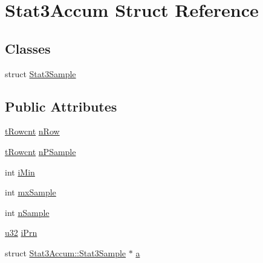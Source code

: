 \hypertarget{struct_stat3_accum}{\section{Stat3\-Accum Struct Reference}
\label{struct_stat3_accum}
}
\subsection*{Classes}
\begin{DoxyCompactItemize}
\item 
struct \hyperlink{struct_stat3_accum_1_1_stat3_sample}{Stat3\-Sample}
\end{DoxyCompactItemize}
\subsection*{Public Attributes}
\begin{DoxyCompactItemize}
\item 
\hyperlink{sqlite3_8c_a6de101211e945e499510b624a65c28a4}{t\-Rowcnt} \hyperlink{struct_stat3_accum_a9232d8f0271bc7feff09927e1683fdfc}{n\-Row}
\item 
\hyperlink{sqlite3_8c_a6de101211e945e499510b624a65c28a4}{t\-Rowcnt} \hyperlink{struct_stat3_accum_aaad385a6c7100fc8674f98bee196d78d}{n\-P\-Sample}
\item 
int \hyperlink{struct_stat3_accum_a33a25df2bf3dae63cc1960d4e5586e1d}{i\-Min}
\item 
int \hyperlink{struct_stat3_accum_a736d6f6da776d17f54a87e31a457f4bb}{mx\-Sample}
\item 
int \hyperlink{struct_stat3_accum_a184bb13725f39f27c8d8af88a52d198e}{n\-Sample}
\item 
\hyperlink{sqlite3_8c_a03ad5adfaeb9b7640dde78a0cc390319}{u32} \hyperlink{struct_stat3_accum_a44d4e5372a3656038d935b09e4d5d8de}{i\-Prn}
\item 
struct \hyperlink{struct_stat3_accum_1_1_stat3_sample}{Stat3\-Accum\-::\-Stat3\-Sample} $\ast$ \hyperlink{struct_stat3_accum_ab4c3e63dea8ab19f10fd636e8062c108}{a}
\end{DoxyCompactItemize}



